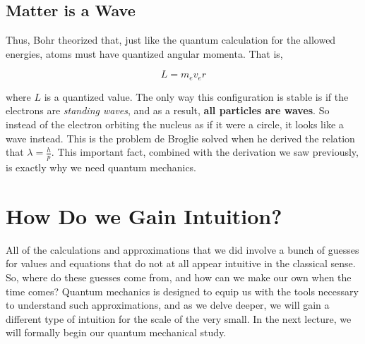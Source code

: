         \subsection{Matter is a Wave}
          Thus, Bohr theorized that, just like the quantum calculation for the allowed energies, atoms must have quantized angular momenta. That is,

          \[ L = m_e v_e r\]

          where $L$ is a quantized value. The only way this configuration is stable is if the electrons are \textit{standing waves}, and as a result, \textbf{all particles are waves}. So instead of the electron orbiting the nucleus as if it were a circle, it looks like a wave instead. This is the problem de Broglie solved when he derived the relation that $\lambda = \frac{h}{p}$. This important fact, combined with the derivation we saw previously, is exactly why we need quantum mechanics.

      \section{How Do we Gain Intuition?}
        All of the calculations and approximations that we did involve a bunch of guesses for values and equations that do not at all appear intuitive in the classical sense. So, where do these guesses come from, and how can we make our own when the time comes? Quantum mechanics is designed to equip us with the tools necessary to understand such approximations, and as we delve deeper, we will gain a different type of intuition for the scale of the very small. In the next lecture, we will formally begin our quantum mechanical study.